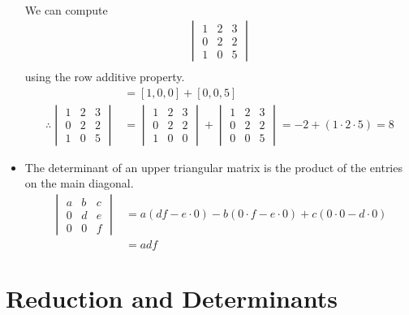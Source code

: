 \begin{itemize}
\begin{align*}
    \end{align*}
    We can compute
    \begin{align*}
      \begin{vmatrix}
        1 & 2 & 3\\
        0 & 2 & 2\\
        1 & 0 & 5
      \end{vmatrix}\\
    \end{align*}
    using the row additive property.
    \begin{align*}
      [1, 0, 5] &= [1, 0, 0] + [0, 0, 5] \\
      \therefore
      \begin{vmatrix}
        1 & 2 & 3\\
        0 & 2 & 2\\
        1 & 0 & 5
      \end{vmatrix}
      &= \begin{vmatrix}
        1 & 2 & 3\\
        0 & 2 & 2\\
        1 & 0 & 0
      \end{vmatrix}
      + \begin{vmatrix}
        1 & 2 & 3\\
        0 & 2 & 2\\
        0 & 0 & 5
      \end{vmatrix}
      = -2 + (1 \cdot 2 \cdot 5) = 8
    \end{align*}
  \item The determinant of an upper triangular matrix is the product of the entries on the main diagonal.
    \begin{align*}
      \begin{vmatrix}
        a & b & c\\
        0 & d & e\\
        0 & 0 & f
      \end{vmatrix}
      &= a(df - e \cdot 0) - b(0 \cdot f - e \cdot 0) + c(0 \cdot 0 - d \cdot 0) \\
      &= adf
    \end{align*}
\end{itemize}

\section{Reduction and Determinants}

